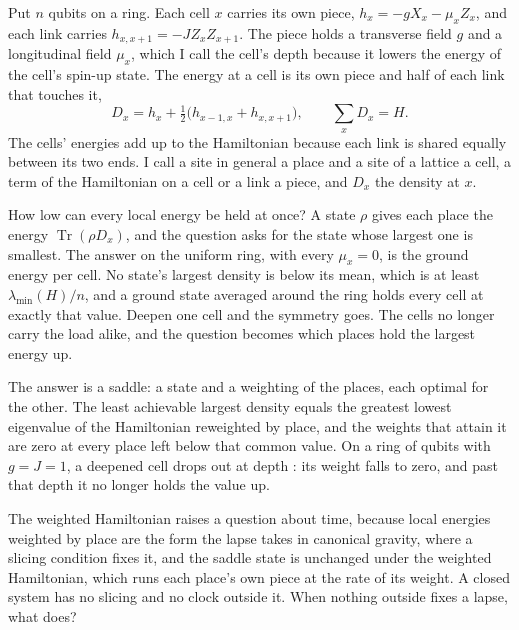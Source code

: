\documentclass[aps,prd,reprint,superscriptaddress]{revtex4-2}
\begin{document}
Put $n$ qubits on a ring. Each cell $x$ carries its own piece, $h_x = -gX_x - \mu_x Z_x$, and each link carries $h_{x,x+1} = -J Z_x Z_{x+1}$. The piece holds a transverse field $g$ and a longitudinal field $\mu_x$, which I call the cell's depth because it lowers the energy of the cell's spin-up state. The energy at a cell is its own piece and half of each link that touches it,
\begin{equation}
  D_x = h_x + \tfrac12\big(h_{x-1,x} + h_{x,x+1}\big), \qquad \sum_x D_x = H .
  \label{eq:density}
\end{equation}
The cells' energies add up to the Hamiltonian because each link is shared equally between its two ends. I call a site in general a place and a site of a lattice a cell, a term of the Hamiltonian on a cell or a link a piece, and $D_x$ the density at $x$.

How low can every local energy be held at once? A state $\rho$ gives each place the energy $\operatorname{Tr}(\rho D_x)$, and the question asks for the state whose largest one is smallest. The answer on the uniform ring, with every $\mu_x = 0$, is the ground energy per cell. No state's largest density is below its mean, which is at least $\lambda_{\min}(H)/n$, and a ground state averaged around the ring holds every cell at exactly that value. Deepen one cell and the symmetry goes. The cells no longer carry the load alike, and the question becomes which places hold the largest energy up.

The answer is a saddle: a state and a weighting of the places, each optimal for the other. The least achievable largest density equals the greatest lowest eigenvalue of the Hamiltonian reweighted by place, and the weights that attain it are zero at every place left below that common value. On a ring of  qubits with $g = J = 1$, a deepened cell drops out at depth : its weight falls to zero, and past that depth it no longer holds the value up.

The weighted Hamiltonian raises a question about time, because local energies weighted by place are the form the lapse takes in canonical gravity, where a slicing condition fixes it, and the saddle state is unchanged under the weighted Hamiltonian, which runs each place's own piece at the rate of its weight. A closed system has no slicing and no clock outside it. When nothing outside fixes a lapse, what does?
\end{document}
